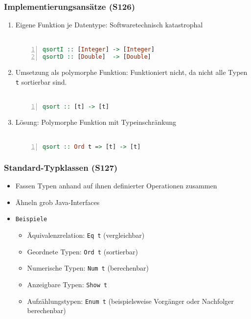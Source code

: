 \subsubsection{Implementierungsansätze (S126)}
\begin{enumerate}
	\item Eigene Funktion je Datentype: Softwaretechnisch katastrophal\\\\
	\begin{minipage}{\linewidth}
	\begin{lstlisting}[frame=single,numbers=left,mathescape,language=Haskell]
qsortI :: [Integer] -> [Integer]
qsortD :: [Double]  -> [Double]
	\end{lstlisting}
	\end{minipage}
	\item Umsetzung als polymorphe Funktion: Funktioniert nicht, da nicht alle Typen \texttt{t} sortierbar sind.\\\\
	\begin{minipage}{\linewidth}
	\begin{lstlisting}[frame=single,numbers=left,mathescape,language=Haskell]
qsort :: [t] -> [t]
	\end{lstlisting}
	\end{minipage}
	\item Lösung: Polymorphe Funktion mit Typeinschränkung\\\\
	\begin{minipage}{\linewidth}
	\begin{lstlisting}[frame=single,numbers=left,mathescape,language=Haskell]
qsort :: Ord t => [t] -> [t]
	\end{lstlisting}
	\end{minipage}
\end{enumerate}

\subsubsection{Standard-Typklassen (S127)}
\begin{itemize}
	\item Fassen Typen anhand auf ihnen definierter Operationen zusammen
	\item Ähneln grob Java-Interfaces
	\item \texttt{Beispiele}
	\begin{itemize}
		\item Äquivalenzrelation: \texttt{Eq t} (vergleichbar)
		\item Geordnete Typen: \texttt{Ord t} (sortierbar)
		\item Numerische Typen: \texttt{Num t} (berechenbar)
		\item Anzeigbare Typen: \texttt{Show t}
		\item Aufzählungstypen: \texttt{Enum t} (beispielsweise Vorgänger oder Nachfolger berechenbar)
	\end{itemize}
\end{itemize}

